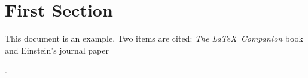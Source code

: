 \documentclass{article}
\begin{document}
\section{First Section}
This document is an example, Two items are cited: \textit{The \LaTeX\ Companion} book \cite[see][chap 2]{latexcompanion} and Einstein's journal paper 

\citep{einstein}. 



\end{document}
